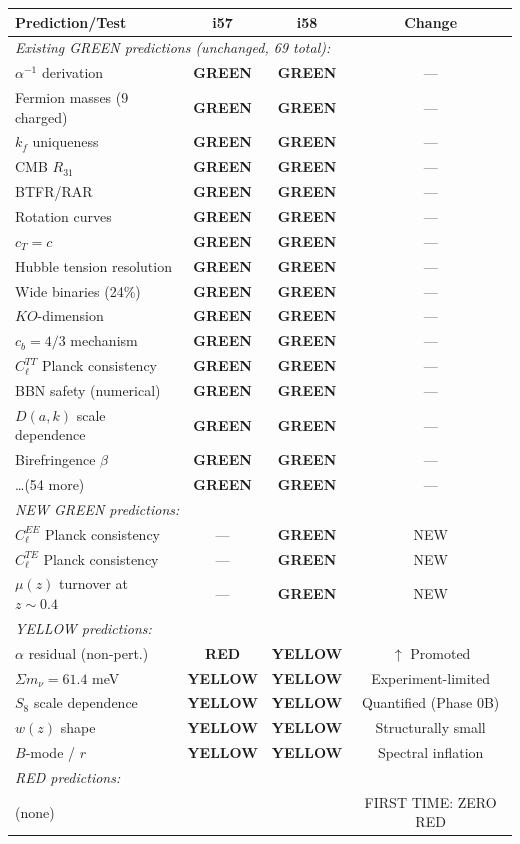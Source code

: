 \documentclass[11pt,a4paper]{article}
\newcommand{\GREEN}{\textcolor{dfdgreen}{\textbf{GREEN}}}
\newcommand{\YELLOW}{\textcolor{dfdyellow}{\textbf{YELLOW}}}
\newcommand{\RED}{\textcolor{dfdred}{\textbf{RED}}}
\begin{document}
\begin{center}
\begin{longtable}{p{5cm}ccc}
\toprule
\textbf{Prediction/Test} & \textbf{i57} & \textbf{i58} & \textbf{Change} \\
\midrule
\multicolumn{4}{l}{\textit{Existing GREEN predictions (unchanged, 69 total):}} \\
$\alpha^{-1}$ derivation & \GREEN & \GREEN & --- \\
Fermion masses (9 charged) & \GREEN & \GREEN & --- \\
$k_f$ uniqueness & \GREEN & \GREEN & --- \\
CMB $R_{31}$ & \GREEN & \GREEN & --- \\
BTFR/RAR & \GREEN & \GREEN & --- \\
Rotation curves & \GREEN & \GREEN & --- \\
$c_T = c$ & \GREEN & \GREEN & --- \\
Hubble tension resolution & \GREEN & \GREEN & --- \\
Wide binaries (24\%) & \GREEN & \GREEN & --- \\
$KO$-dimension & \GREEN & \GREEN & --- \\
$c_b = 4/3$ mechanism & \GREEN & \GREEN & --- \\
$C_\ell^{TT}$ Planck consistency & \GREEN & \GREEN & --- \\
BBN safety (numerical) & \GREEN & \GREEN & --- \\
$D(a,k)$ scale dependence & \GREEN & \GREEN & --- \\
Birefringence $\beta$ & \GREEN & \GREEN & --- \\
\ldots (54 more) & \GREEN & \GREEN & --- \\
\midrule
\multicolumn{4}{l}{\textit{NEW GREEN predictions:}} \\
$C_\ell^{EE}$ Planck consistency & --- & \GREEN & NEW \\
$C_\ell^{TE}$ Planck consistency & --- & \GREEN & NEW \\
$\mu(z)$ turnover at $z \sim 0.4$ & --- & \GREEN & NEW \\
\midrule
\multicolumn{4}{l}{\textit{YELLOW predictions:}} \\
$\alpha$ residual (non-pert.) & \RED & \YELLOW & $\uparrow$ Promoted \\
$\Sigma m_\nu = 61.4$ meV & \YELLOW & \YELLOW & Experiment-limited \\
$S_8$ scale dependence & \YELLOW & \YELLOW & Quantified (Phase 0B) \\
$w(z)$ shape & \YELLOW & \YELLOW & Structurally small \\
$B$-mode / $r$ & \YELLOW & \YELLOW & Spectral inflation \\
\midrule
\multicolumn{4}{l}{\textit{RED predictions:}} \\
(none) & & & FIRST TIME: ZERO RED \\
\bottomrule
\end{longtable}
\end{center}
\end{document}
